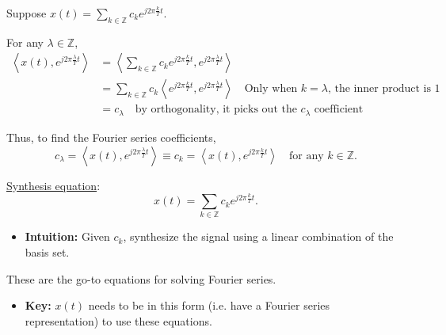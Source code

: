 \begin{derivation}
    Suppose $x(t) = \sum_{k \in \mathbb{Z}} c_k e^{j 2\pi \frac{k}{T} t}$.

    For any $\lambda \in \mathbb{Z}$,
    \begin{align*}
        \left\langle x(t), e^{j 2\pi \frac{\lambda}{T} t} \right\rangle &= \left\langle \sum_{k \in \mathbb{Z}} c_k e^{j 2\pi \frac{k}{T} t}, e^{j 2\pi \frac{\lambda}{T} t} \right\rangle \\
        &= \sum_{k \in \mathbb{Z}} c_k \left\langle e^{j 2\pi \frac{k}{T} t}, e^{j 2\pi \frac{\lambda}{T} t} \right\rangle \quad \text{Only when $k=\lambda$, the inner product is 1}\\
        &= c_\lambda \quad \text{by orthogonality, it picks out the $c_\lambda$ coefficient}
    \end{align*}

    Thus, to find the Fourier series coefficients,
    \[
    c_\lambda = \left\langle x(t), e^{j 2\pi \frac{\lambda}{T} t} \right\rangle \equiv c_k = \left\langle x(t), e^{j 2\pi \frac{k}{T} t} \right\rangle \quad \text{for any } k \in \mathbb{Z}.
    \]
\end{derivation}

\begin{definition}
    \underline{Synthesis equation}:
    \[
    x(t) = \sum_{k \in \mathbb{Z}} c_k e^{j 2\pi \frac{k}{T} t}.
    \]
    \begin{itemize}
        \item \textbf{Intuition:} Given $c_k$, synthesize the signal using a linear combination of the basis set. 
    \end{itemize}
\end{definition}

\begin{warning}
    These are the go-to equations for solving Fourier series. 
    \begin{itemize}
        \item \textbf{Key:} $x(t)$ needs to be in this form (i.e. have a Fourier series representation) to use these equations. 
    \end{itemize}
\end{warning}